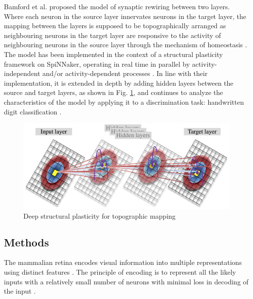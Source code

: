 \documentclass[letterpaper, 10 pt, conference]{ieeeconf}  %
\begin{document}
Bamford et al. \cite{bamford2010synaptic} proposed the model of synaptic rewiring between two layers. 
Where each neuron in the source layer innervates neurons in the target layer, the mapping between the layers is supposed to be topographically arranged as neighbouring neurons in the target layer are responsive to the activity of neighbouring neurons in the source layer \cite{udin1988formation} through the mechanism of homeostasis \cite{Butz2009}. 
The model has been implemented in the context of a structural plasticity framework on SpiNNaker, operating in real time in parallel by activity-independent and/or activity-dependent processes \cite{bogdan2018structural}.
In line with their implementation, it is extended in depth by adding hidden layers between the source and target layers, as shown in Fig. \ref{fig:dsp}, and continues to analyze the characteristics of the model by applying it to a discrimination task: handwritten digit classification \cite{hopkins2018spiking}.

\begin{figure}[tbh]
    \centering
    \includegraphics[width=0.90\linewidth, trim=0cm 0cm 0cm 0cm, clip=true]{DSP_n}
    \caption{Deep structural plasticity for topographic mapping}
    \label{fig:dsp}
\end{figure}

\subsection{Methods}
The mammalian retina encodes visual information into multiple representations using distinct features \cite{roska2014retina}. The principle of encoding is to represent all the likely inputs with a relatively small number of neurons with minimal loss in decoding of the input \cite{field1994goal}.
\end{document}
